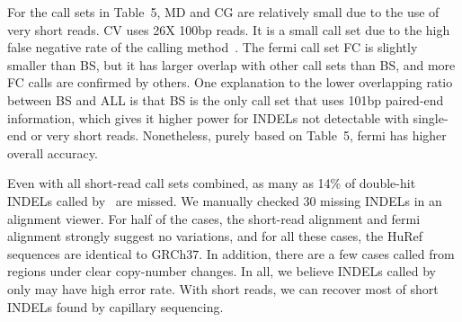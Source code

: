\documentclass{bioinfo}
\begin{document}
For the call sets in Table~5, MD and CG are relatively small due to the use of
very short reads. CV uses 26X 100bp reads. It is a small call set due to the
high false negative rate of the calling method~\citep{Iqbal:2012ys}. The fermi
call set FC is slightly smaller than BS, but it has larger overlap with other
call sets than BS, and more FC calls are confirmed by others. One explanation
to the lower overlapping ratio between BS and ALL is that BS is the only call
set that uses 101bp paired-end information, which gives it higher power for
INDELs not detectable with single-end or very short reads.  Nonetheless, purely
based on Table~5, fermi has higher overall accuracy.


Even with all short-read call sets combined, as many as 14\% of double-hit
INDELs called by~\citet{Mills:2011fk} are missed. We manually checked 30
missing INDELs in an alignment viewer. For half of the cases, the short-read
alignment and fermi alignment strongly suggest no variations, and for all these
cases, the HuRef sequences are identical to GRCh37. In addition, there are a few
cases called from regions under clear copy-number changes. In all, we believe
INDELs called by~\citet{Mills:2011fk} only may have high error rate. With
short reads, we can recover most of short INDELs found by capillary sequencing.
\end{document}
